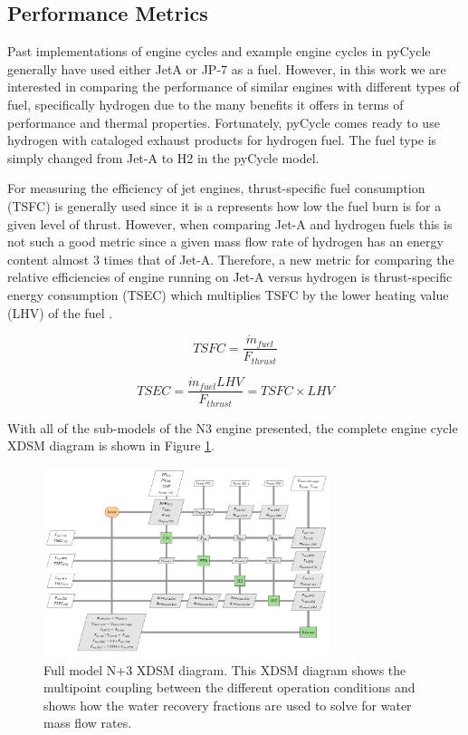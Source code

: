 \documentclass[conf]{new-aiaa}
\begin{document}
\subsection{Performance Metrics}
Past implementations of engine cycles and example engine cycles in pyCycle generally have used either JetA or JP-7 as a fuel.
However, in this work we are interested in comparing the performance of similar engines with different types of fuel, specifically hydrogen due to the many benefits it offers in terms of performance and thermal properties.
Fortunately, pyCycle comes ready to use hydrogen with cataloged exhaust products for hydrogen fuel.
The fuel type is simply changed from Jet-A to H2 in the pyCycle model.

For measuring the efficiency of jet engines, thrust-specific fuel consumption (TSFC) is generally used since it is a represents how low the fuel burn is for a given level of thrust.
However, when comparing Jet-A and hydrogen fuels this is not such a good metric since a given mass flow rate of hydrogen has an energy content almost 3 times that of Jet-A.
Therefore, a new metric for comparing the relative efficiencies of engine running on Jet-A versus hydrogen is thrust-specific energy consumption (TSEC) which multiplies TSFC by the lower heating value (LHV) of the fuel \cite{Adler2023}.

\begin{equation}
    TSFC = \frac{\Dot{m}_{fuel}}{F_{thrust}}
\end{equation}

\begin{equation}
    TSEC = \frac{\Dot{m}_{fuel} LHV}{F_{thrust}} = TSFC \times LHV
\end{equation}

With all of the sub-models of the N3 engine presented, the complete engine cycle XDSM diagram is shown in Figure \ref{fig:N3_xdsm_full}.

\begin{figure}[hbt!]
    \centering
    \includegraphics[width=0.75\textwidth]{N3_xdsm_full.pdf}
    \caption{
        Full model N+3 XDSM diagram.
        This XDSM diagram shows the multipoint coupling between the different operation conditions and shows how the water recovery fractions are used to solve for water mass flow rates.
    }
    \label{fig:N3_xdsm_full}
\end{figure}
\end{document}
